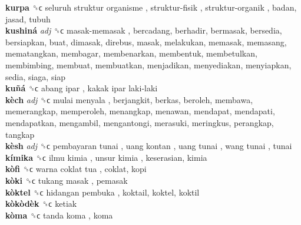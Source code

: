 \textbf{kurpa} ␝ϲ   seluruh struktur organisme ,  struktur-fisik ,  struktur-organik , badan, jasad, tubuh  \\
\textbf{kushiná} \emph{adj}  ␝ϲ   masak-memasak , bercadang, berhadir, bermasak, bersedia, bersiapkan, buat, dimasak, direbus, masak, melakukan, memasak, memasang, mematangkan, membagar, membenarkan, membentuk, membetulkan, membimbing, membuat, membuatkan, menjadikan, menyediakan, menyiapkan, sedia, siaga, siap  \\
\textbf{kuñá} ␝ϲ   abang ipar ,  kakak ipar laki-laki   \\
\textbf{kèch} \emph{adj}  ␝ϲ   mulai menyala , berjangkit, berkas, beroleh, membawa, memerangkap, memperoleh, menangkap, menawan, mendapat, mendapati, mendapatkan, mengambil, mengantongi, merasuki, meringkus, perangkap, tangkap  \\
\textbf{kèsh} \emph{adj}  ␝ϲ   pembayaran tunai ,  uang kontan ,  uang tunai ,  wang tunai , tunai  \\
\textbf{kímika} ␝ϲ   ilmu kimia ,  unsur kimia , keserasian, kimia  \\
\textbf{kòfi} ␝ϲ   warna coklat tua , coklat, kopi  \\
\textbf{kòki} ␝ϲ   tukang masak , pemasak  \\
\textbf{kòktel} ␝ϲ   hidangan pembuka , koktail, koktel, koktil  \\
\textbf{kòkòdèk} ␝ϲ  ketiak  \\
\textbf{kòma} ␝ϲ   tanda koma , koma  \\
